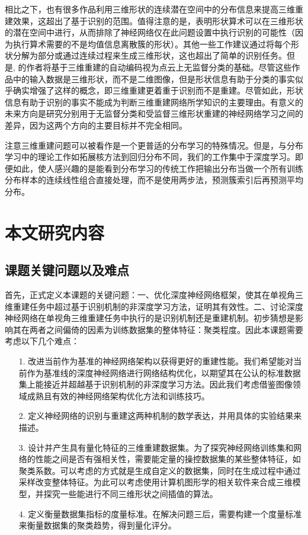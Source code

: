 \documentclass[bachelor, nocolorlinks, printoneside]{seuthesis} %
\begin{document}
\begin{Main}
相比之下，也有很多作品利用三维形状的连续潜在空间中的分布信息\cite{li2018single,gwak2017weakly,sinha2017surfnet,li2018point,wu2018learning,yang20173d,yang2019pointflow}来提高三维重建效果，这超出了基于识别的范围。值得注意的是，\cite{wu2016learning,girdhar2016learning}表明形状算术可以在三维形状的潜在空间中进行，从而排除了神经网络仅在此问题设置中执行识别的可能性（因为执行算术需要的不是均值信息离散簇的形状）。其他一些工作建议通过将每个形状分解为部分\cite{tulsiani2017learning,niu2018im2struct,sung2017complementme}或通过连续过程\cite{sun2018pointgrow,choy20163d}来生成三维形状，这也超出了简单的识别任务。但是, \cite{wu2016learning,achlioptas2017learning,yang2018foldingnet}的作者将基于三维重建的自动编码视为点云上无监督分类的基础。尽管这些作品中的输入数据是三维形状，而不是二维图像，但是形状信息有助于分类的事实似乎确实增强了这样的概念，即三维重建更着重于识别而不是重建。尽管如此，形状信息有助于识别的事实不能成为判断三维重建网络所学知识的主要理由。有意义的未来方向是研究分别用于无监督分类和受监督三维形状重建的神经网络学习之间的差异，因为这两个方向的主要目标并不完全相同。

注意三维重建问题可以被看作是一个更普适的分布学习\cite{oliva2013distribution,poczos2013distribution}的特殊情况。但是，与分布学习中的理论工作如拓展核方法到回归分布不同，我们的工作集中于深度学习。即便如此，使人感兴趣的是能看到分布学习的传统工作把输出分布当做一个所有训练分布样本的连续线性组合直接处理，而不是使用两步法，预测簇索引后再预测平均分布。
\section{本文研究内容}
\subsection{课题关键问题以及难点}
首先，正式定义本课题的关键问题：一、优化深度神经网络框架，使其在单视角三维重建任务中超过基于识别机制的非深度学习方法，证明其有效性。二、讨论深度神经网络在单视角三维重建任务中执行的是识别机制还是重建机制。初步猜想是影响其在两者之间偏倚的因素为训练数据集的整体特征：聚类程度。因此本课题需要考虑以下几个难点：
\begin{enumerate}
    \item[1.]改进当前作为基准的神经网络架构以获得更好的重建性能。我们希望能对当前作为基准线的深度神经网络进行网络结构优化，以期望其在公认的标准数据集上能接近并超越基于识别机制的非深度学习方法。因此我们考虑借鉴图像领域成熟且有效的神经网络架构优化方法和训练技巧。
    \item[2.]定义神经网络的识别与重建这两种机制的数学表达，并用具体的实验结果来描述。
    \item[3.]设计并产生具有量化特征的三维重建数据集。为了探究神经网络训练集和网络的性能之间是否有强相关性，需要能定量的操控数据集的某些整体特征，如聚类系数。可以考虑的方式就是生成自定义的数据集，同时在生成过程中通过采样改变整体特征。为此可以考虑使用计算机图形学的相关软件来合成三维模型，并探究一些能进行不同三维形状之间插值的算法。
    \item[4.]定义衡量数据集指标的度量标准。在解决问题三后，需要构建一个度量标准来衡量数据集的聚类趋势，得到量化评分。   
\end{enumerate}

\end{Main}
\end{document}
